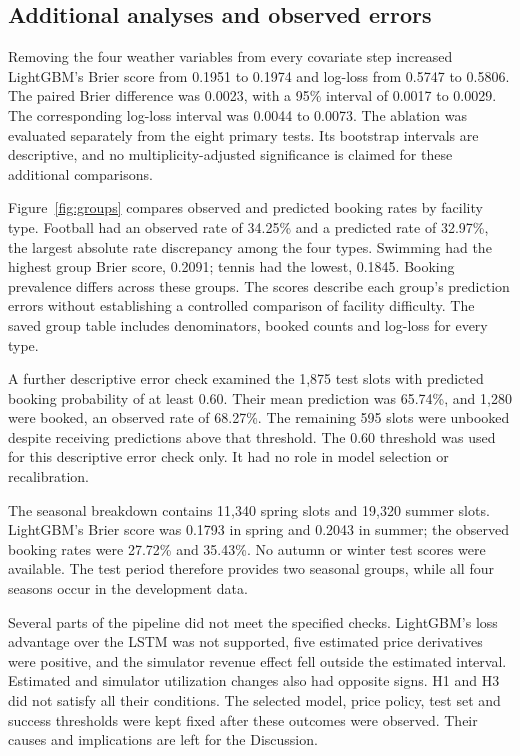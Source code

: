 \subsection{Additional analyses and observed errors}
Removing the four weather variables from every covariate step increased LightGBM's Brier score from 0.1951 to 0.1974 and log-loss from 0.5747 to 0.5806. The paired Brier difference was 0.0023, with a 95\% interval of 0.0017 to 0.0029. The corresponding log-loss interval was 0.0044 to 0.0073. The ablation was evaluated separately from the eight primary tests. Its bootstrap intervals are descriptive, and no multiplicity-adjusted significance is claimed for these additional comparisons.

Figure~\ref{fig:groups} compares observed and predicted booking rates by facility type. Football had an observed rate of 34.25\% and a predicted rate of 32.97\%, the largest absolute rate discrepancy among the four types. Swimming had the highest group Brier score, 0.2091; tennis had the lowest, 0.1845. Booking prevalence differs across these groups. The scores describe each group's prediction errors without establishing a controlled comparison of facility difficulty. The saved group table includes denominators, booked counts and log-loss for every type.

A further descriptive error check examined the 1,875 test slots with predicted booking probability of at least 0.60. Their mean prediction was 65.74\%, and 1,280 were booked, an observed rate of 68.27\%. The remaining 595 slots were unbooked despite receiving predictions above that threshold. The 0.60 threshold was used for this descriptive error check only. It had no role in model selection or recalibration.

The seasonal breakdown contains 11,340 spring slots and 19,320 summer slots. LightGBM's Brier score was 0.1793 in spring and 0.2043 in summer; the observed booking rates were 27.72\% and 35.43\%. No autumn or winter test scores were available. The test period therefore provides two seasonal groups, while all four seasons occur in the development data.

Several parts of the pipeline did not meet the specified checks. LightGBM's loss advantage over the LSTM was not supported, five estimated price derivatives were positive, and the simulator revenue effect fell outside the estimated interval. Estimated and simulator utilization changes also had opposite signs. H1 and H3 did not satisfy all their conditions. The selected model, price policy, test set and success thresholds were kept fixed after these outcomes were observed. Their causes and implications are left for the Discussion.


